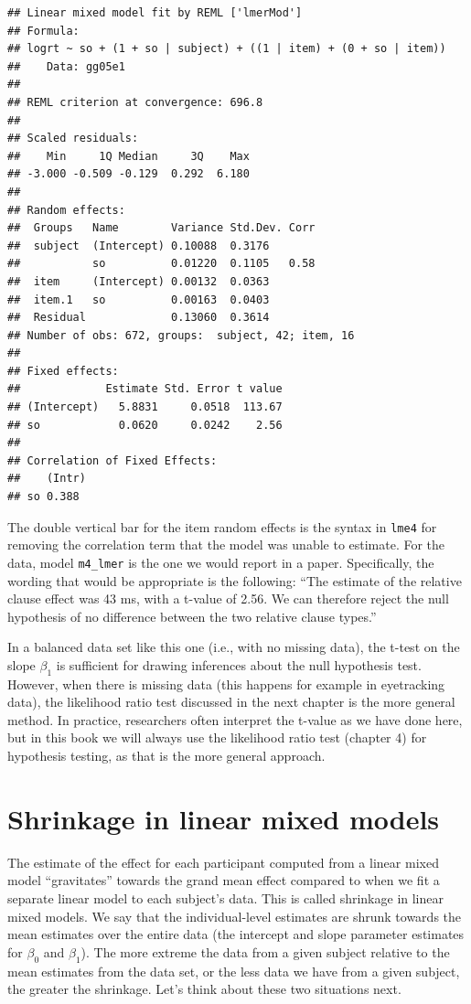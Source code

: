 \documentclass[
  12pt,
]{krantz}
\theoremstyle{definition}
\theoremstyle{definition}
\theoremstyle{definition}
\theoremstyle{definition}
\theoremstyle{remark}
\begin{document}
\begin{verbatim}
## Linear mixed model fit by REML ['lmerMod']
## Formula: 
## logrt ~ so + (1 + so | subject) + ((1 | item) + (0 + so | item))
##    Data: gg05e1
## 
## REML criterion at convergence: 696.8
## 
## Scaled residuals: 
##    Min     1Q Median     3Q    Max 
## -3.000 -0.509 -0.129  0.292  6.180 
## 
## Random effects:
##  Groups   Name        Variance Std.Dev. Corr
##  subject  (Intercept) 0.10088  0.3176       
##           so          0.01220  0.1105   0.58
##  item     (Intercept) 0.00132  0.0363       
##  item.1   so          0.00163  0.0403       
##  Residual             0.13060  0.3614       
## Number of obs: 672, groups:  subject, 42; item, 16
## 
## Fixed effects:
##             Estimate Std. Error t value
## (Intercept)   5.8831     0.0518  113.67
## so            0.0620     0.0242    2.56
## 
## Correlation of Fixed Effects:
##    (Intr)
## so 0.388
\end{verbatim}

The double vertical bar for the item random effects is the syntax in \texttt{lme4} for removing the correlation term that the model was unable to estimate. For the \citet{grodner} data, model \texttt{m4\_lmer} is the one we would report in a paper. Specifically, the wording that would be appropriate is the following: ``The estimate of the relative clause effect was 43 ms, with a t-value of 2.56. We can therefore reject the null hypothesis of no difference between the two relative clause types.''

In a balanced data set like this one (i.e., with no missing data), the t-test on the slope \(\beta_1\) is sufficient for drawing inferences about the null hypothesis test. However, when there is missing data (this happens for example in eyetracking data), the likelihood ratio test discussed in the next chapter is the more general method. In practice, researchers often interpret the t-value as we have done here, but in this book we will always use the likelihood ratio test (chapter 4) for hypothesis testing, as that is the more general approach.

\hypertarget{shrinkage-in-linear-mixed-models}{%
\section{Shrinkage in linear mixed models}\label{shrinkage-in-linear-mixed-models}}

The estimate of the effect for each participant computed from a linear mixed model ``gravitates'' towards the grand mean effect compared to when we fit a separate linear model to each subject's data.
This is called shrinkage in linear mixed models. We say that the individual-level estimates are shrunk towards the mean estimates over the entire data (the intercept and slope parameter estimates for \(\beta_0\) and \(\beta_1\)).
The more extreme the data from a given subject relative to the mean estimates from the data set, or the less data we have from a given subject, the greater the shrinkage. Let's think about these two situations next.
\end{document}
